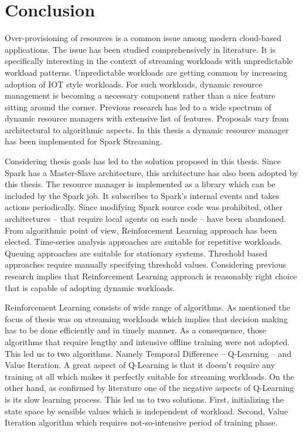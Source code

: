 \chapter{Conclusion}
\label{conc}

Over-provisioning of resources is a common issue among modern cloud-based applications. The issue has been studied comprehensively in literature. It is specifically interesting in the context of streaming workloads with unpredictable workload patterns. Unpredictable workloads are getting common by increasing adoption of IOT style workloads. For such workloads, dynamic resource management is becoming a necessary component rather than a nice feature sitting around the corner. Previous research has led to a wide spectrum of dynamic resource managers with extensive list of features. Proposals vary from architectural to algorithmic aspects. In this thesis a dynamic resource manager has been implemented for Spark Streaming. 

Considering thesis goals has led to the solution proposed in this thesis. Since Spark has a Master-Slave architecture, this architecture has also been adopted by this thesis. The resource manager is implemented as a library which can be included by the Spark job. It subscribes to Spark's internal events and takes actions periodically. Since modifying Spark source code was prohibited, other architectures -- that require local agents on each node -- have been abandoned. From algorithmic point of view, Reinforcement Learning approach has been elected. Time-series analysis approaches are suitable for repetitive workloads. Queuing approaches are suitable for stationary systems. Threshold based approaches require manually specifying threshold values. Considering previous research implies that Reinforcement Learning approach is reasonably right choice that is capable of adopting dynamic workloads.

Reinforcement Learning consists of wide range of algorithms. As mentioned the focus of thesis was on streaming workloads which implies that decision making has to be done efficiently and in timely manner. As a consequence, those algorithms that require lengthy and intensive offline training were not adopted. This led us to two algorithms. Namely Temporal Difference -- Q-Learning --  and Value Iteration. A great aspect of Q-Learning is that it doesn't require any training at all which makes it perfectly suitable for streaming workloads. On the other hand, as confirmed by literature one of the negative aspects of Q-Learning is its slow learning process. This led us to two solutions. First, initializing the state space by sensible values which is independent of workload. Second, Value Iteration algorithm which requires not-so-intensive period of training phase.

